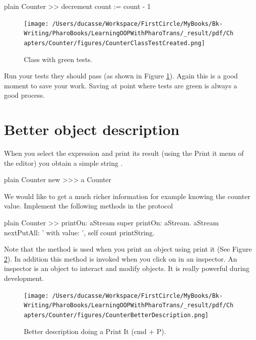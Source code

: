 \documentclass[10pt,twoside,english]{_support/latex/sbabook/sbabook}
\begin{document}
\begin{displaycode}{plain}
Counter >> decrement
   count := count - 1
\end{displaycode}


\begin{figure}

\begin{center}
\texttt{[image: /Users/ducasse/Workspace/FirstCircle/MyBooks/Bk-Writing/PharoBooks/LearningOOPWithPharoTrans/\_result/pdf/Chapters/Counter/figures/CounterClassTestCreated.png]}\caption{Class with green tests.\label{figclassTestCreated}}\end{center}
\end{figure}


Run your tests they should pass (as shown in Figure \ref{figclassTestCreated}). Again this is a good moment to save your work. Saving at point where tests are green
is always a good process. 
\section{Better object description}
When you select the expression  and print its result (using the Print it menu of the editor) you obtain a simple string .

\begin{displaycode}{plain}
Counter new
>>> a Counter
\end{displaycode}

We would like to get a much richer information for example knowing the counter value. Implement the following methods in the protocol 

\begin{displaycode}{plain}
Counter >> printOn: aStream
   super printOn: aStream.
   aStream nextPutAll: ' with value: ', self count printString.
\end{displaycode}

Note that the method  is used when you print an object using print it (See Figure \ref{figBetterDescription}). In addition this method is invoked when you click on  in an inspector. An inspector is an object to interact and modify objects. It is really powerful during development.


\begin{figure}

\begin{center}
\texttt{[image: /Users/ducasse/Workspace/FirstCircle/MyBooks/Bk-Writing/PharoBooks/LearningOOPWithPharoTrans/\_result/pdf/Chapters/Counter/figures/CounterBetterDescription.png]}\caption{Better description doing a Print It (cmd + P).\label{figBetterDescription}}\end{center}
\end{figure}
\end{document}
